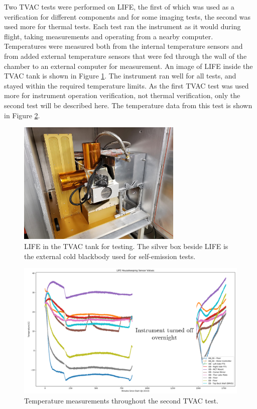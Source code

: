 Two TVAC tests were performed on LIFE, the first of which was used as a verification for different components and for some imaging tests, the second was used more for thermal tests. Each test ran the instrument as it would during flight, taking measurements and operating from a nearby computer. Temperatures were measured both from the internal temperature sensors and from added external temperature sensors that were fed through the wall of the chamber to an external computer for measurement. An image of LIFE inside the TVAC tank is shown in Figure \ref{fig:LIFE_in_TVAC}. The instrument ran well for all tests, and stayed within the required temperature limits. As the first TVAC test was used more for instrument operation verification, not thermal verification, only the second test will be described here. The temperature data from this test is shown in Figure \ref{fig:TVAC2_data}.

\begin{figure}
    \centering
    \includegraphics[width=0.7\textwidth]{chap3_images/LIFE_in_TVAC.jpg}
    \caption{LIFE in the TVAC tank for testing. The silver box beside LIFE is the external cold blackbody used for self-emission tests.}
    \label{fig:LIFE_in_TVAC}
\end{figure}

\begin{figure}
    \centering
    \includegraphics[width=\textwidth]{chap3_images/TVAC2.png}
    \caption{Temperature measurements throughout the second TVAC test.}
    \label{fig:TVAC2_data}
\end{figure}

